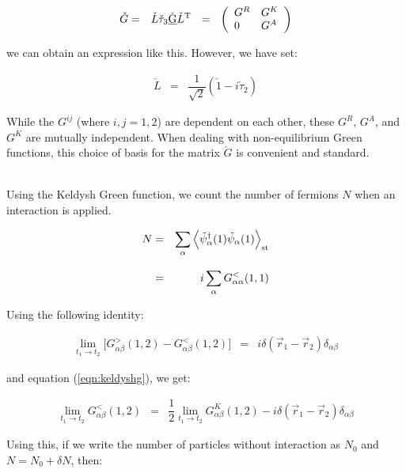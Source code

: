 \documentclass[uplatex,a4j,12pt,dvipdfmx]{jsarticle}
\begin{document}
\begin{eqnarray}
	\check{G}
	&=&
	\check{L}
	\check{\tau}_{3}
	\check{\underbar{G}}
	\check{L}^{\rm T}
	\ \ = \ \
	\left(
	\begin{array}{ll}
			G^{R} & G^{K}
			\\
			0     & G^{A}
		\end{array}
	\right)
\end{eqnarray}

we can obtain an expression like this. However, we have set:

\begin{eqnarray}
	\check{L}
	&=&
	\dfrac{1}{\sqrt{2}}(\check{1} - i \check{\tau}_{2})
\end{eqnarray}

While the $G^{ij}$ (where $i,j=1,2$) are dependent on each other, these $G^{R}$, $G^{A}$, and $G^{K}$ are mutually independent.
When dealing with non-equilibrium Green functions, this choice of basis for the matrix $\check{G}$ is convenient and standard.

\ \\

Using the Keldysh Green function, we count the number of fermions $N$ when an interaction is applied.

\begin{eqnarray}
	N
	&=&
	\sum_{\alpha} \Big\langle \tilde{\psi}_{\alpha}^{\dagger}(1) \tilde{\psi}_{\alpha}(1) \Big\rangle_{\rm st}
	\nonumber \\[3mm] &=&
	i \sum_{\alpha} G^{<}_{\alpha \alpha}(1,1)
\end{eqnarray}

Using the following identity:

\begin{eqnarray}
	\lim_{t_{1} \to t_{2}} \Big[ G^{>}_{\alpha \beta}(1,2) - G^{<}_{\alpha \beta}(1,2) \Big]
	&=&
	i \delta(\vec{r}_{1} - \vec{r}_{2}) \delta_{\alpha \beta}
\end{eqnarray}

and equation (\ref{eqn:keldyshg}), we get:

\begin{eqnarray}
	\lim_{t_{1} \to t_{2}}
	G^{<}_{\alpha \beta}(1,2)
	&=&
	\dfrac{1}{2}
	\lim_{t_{1} \to t_{2}}
	G^{K}_{\alpha \beta}(1,2)
	-
	i \delta(\vec{r}_{1} - \vec{r}_{2}) \delta_{\alpha \beta}
\end{eqnarray}

Using this, if we write the number of particles without interaction as $N_{0}$ and $N=N_{0}+\delta N$, then:
\end{document}
